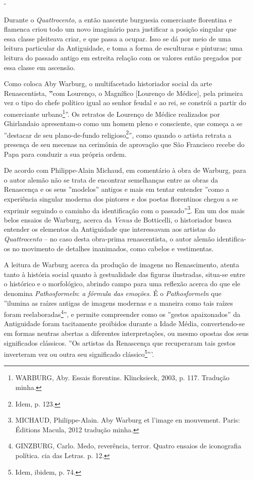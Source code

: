-

Durante o \emph{Quattrocento,} a então nascente burguesia comerciante
florentina e flamenca criou todo um novo imaginário para justificar a
posição singular que essa classe pleiteava criar, e que passa a ocupar.
Isso se dá por meio de uma leitura particular da Antiguidade, e toma a
forma de esculturas e pinturas; uma leitura do passado antigo em
estreita relação com os valores então pregados por essa classe em
ascensão.

Como coloca Aby Warburg, o multifacetado historiador social da arte
Renascentista, \textbf{''}com Lourenço, o Magnífico {[}Lourenço de
Médice{]}, pela primeira vez o tipo do chefe político igual ao senhor
feudal e ao rei, se constrói a partir do comerciante urbano\footnote{WARBURG,
  Aby. Essais florentins. Klincksieck, 2003, p. 117. Tradução minha.}''.
Os retratos de Lourenço de Médice realizados por Ghirlandaio
apresentam-o como um homem pleno e consciente, que começa a se
''destacar de seu plano-de-fundo religioso\footnote{Idem, p. 123.}'',
como quando o artista retrata a presença de seu mecenas na cerimônia de
aprovação que São Francisco recebe do Papa para conduzir a sua própria
ordem.

De acordo com Philippe-Alain Michaud, em comentário à obra de Warburg,
para o autor alemão não se trata de encontrar semelhanças entre as obras
da Renascença e os seus ''modelos'' antigos e mais em tentar entender
''como a experiência singular moderna dos pintores e dos poetas
florentinos chegou a se exprimir seguindo o caminho da identificação com
o passado''\footnote{MICHAUD, Philippe-Alain. Aby
  Warburg et l'image en mouvement. Paris: Éditions Macula, 2012 tradução
  minha.}. Em um dos mais belos ensaios de Warburg, acerca da
\emph{Venus} de Botticelli, o historiador busca entender os elementos da
Antiguidade que interessavam aos artistas do \emph{Quattrocento} -- no
caso desta obra-prima renascentista, o autor alemão identifica-os no
movimento de detalhes inanimados, como cabelos e vestimentas.

A leitura de Warburg acerca da produção de imagens no Renascimento,
atenta tanto à história social quanto à gestualidade das figuras
ilustradas, situa-se entre o histórico e o morfológico, abrindo campo
para uma reflexão acerca do que ele denomina \emph{Pathosformeln}:
\emph{a fórmula das emoções}. É o \emph{Pathosformeln} que ''ilumina as
raízes antigas de imagens modernas e a maneira como tais raízes foram
reelaboradas\footnote{GINZBURG, Carlo. Medo, reverência, terror. Quatro
  ensaios de iconografia política. cia das Letras. p. 12.}'', e permite
compreender como os ''gestos apaixonados'' da Antiguidade foram
tacitamente proibidos durante a Idade Média, convertendo-se em formas
neutras abertas a diferentes interpretações, ou mesmo opostas dos seus
significados clássicos. ''Os artistas da Renascença que recuperaram tais
gestos inverteram vez ou outra seu significado clássico\footnote{Idem,
  ibidem, p. 74.}'''.

